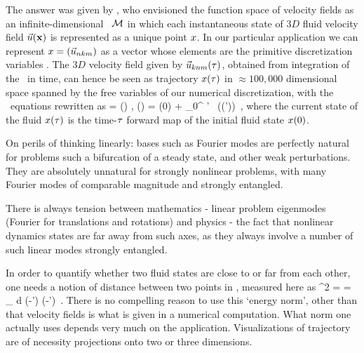 The answer was given by \cite{hopf48}, who envisioned the function space
of {\NS} velocity fields as an infinite-dimensional \statesp\ ${\cal M}$ in
which each instantaneous state of $3D$ fluid velocity field $\vec{u}({\bf x})$ is
represented as a unique point $x$. In our particular application we
can represent $x = (\vec{u}_{nkm})$ as a vector whose elements are the
primitive discretization variables . The $3D$ velocity
field given by $\vec{u}_{knm}(\tau)$, obtained from integration of the
\NSe\ in time, can hence be seen as trajectory $x(\tau)$ in
$\approx 100,000$ dimensional space spanned by the free variables of our
numerical discretization, with the \NS\ equations 
rewritten as
\beq
   \dot{\ssp} = \vel(\ssp) ,
   \qquad
   \ssp(\zeit) = \ssp(0)
            + \int_0^\zeit \! \zeit' \, \vel(\ssp(\zeit'))
\,,
where the current state of the fluid $ x(\tau)$ is the time-$\tau$
forward map of the initial fluid state  $x(0)$.

On perils of thinking linearly: bases such as Fourier modes are
perfectly natural for problems such a bifurcation of a steady state, and
other weak perturbations. They are absolutely unnatural for strongly
nonlinear problems, with many Fourier modes of comparable magnitude and
strongly entangled.

        There is always tension between mathematics - linear problem eigenmodes
        (Fourier for translations and rotations) and physics - the fact that
        nonlinear dynamics states are far away from such axes, as they
        always involve a number of such linear modes strongly entangled.

In order to quantify whether two fluid states are close to or far from
each other, one needs a notion of distance between two points in
\statesp, measured here as
\beq
  ^2  =  =
\int_\bCell \! d \bx \;
(-') \cdot (-')
\,.
There is no compelling reason to use this {`energy norm'}, other than
that velocity fields is what is given in a numerical computation. What
norm one actually uses depends very much on the application.
Visualizations of trajectory  are of necessity
projections onto two or three dimensions.

